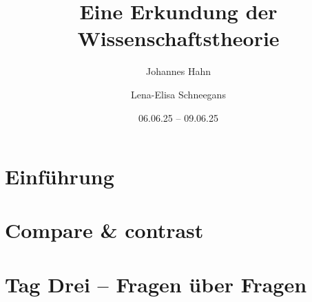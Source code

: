 \documentclass[fontsize=11pt,fleqn,a4paper]{scrartcl}
\author{Johannes Hahn \and Lena-Elisa Schneegans}
\title{Eine Erkundung der Wissenschaftstheorie}
\date{06.06.25 -- 09.06.25}
\begin{document}
\maketitle

\tableofcontents
\pagebreak
\section{Einführung}

\pagebreak

\section{Compare \& contrast}


\pagebreak
\section{Tag Drei -- Fragen über Fragen}

\end{document}
